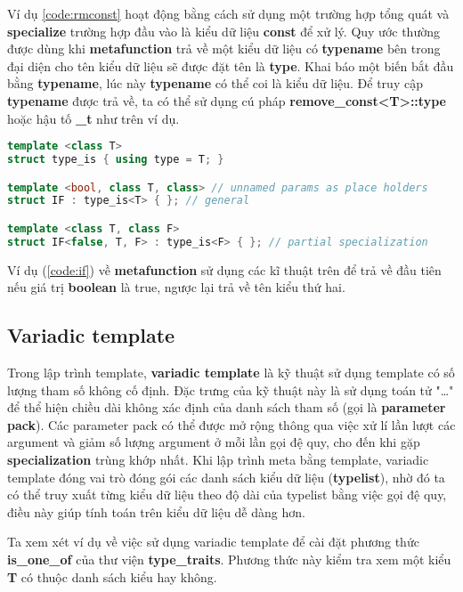 Ví dụ \ref{code:rmconst} hoạt động bằng cách sử dụng một trường hợp tổng quát và \textbf{specialize} trường hợp đầu vào là kiểu dữ liệu \textbf{const} để xử lý.
Quy ước thường được dùng khi \textbf{metafunction} trả về một kiểu dữ liệu có \textbf{typename} bên trong đại diện cho tên kiểu dữ liệu sẽ được đặt tên là \textbf{type}. Khai báo một biến bắt đầu bằng \textbf{typename}, lúc này \textbf{typename} có thể coi là kiểu dữ liệu. Để truy cập \textbf{typename} được trả về, ta có thể sử dụng cú pháp \textbf{remove\_const<T>::type} hoặc hậu tố \textbf{\_t} như trên ví dụ.

\begin{lstlisting}[caption={Trả về kiểu dữ liệu dựa trên điều kiện \cite{Walter}},label={code:if},language=C++]
template <class T>
struct type_is { using type = T; }

template <bool, class T, class> // unnamed params as place holders
struct IF : type_is<T> { }; // general

template <class T, class F>
struct IF<false, T, F> : type_is<F> { }; // partial specialization
\end{lstlisting}

\noindent Ví dụ (\ref{code:if}) về \textbf{metafunction} sử dụng các kĩ thuật trên để trả về đầu tiên nếu giá trị \textbf{boolean} là true, ngược lại trả về tên kiểu thứ hai.

\subsection{Variadic template}
Trong lập trình template, \textbf{variadic template} là kỹ thuật sử dụng template có số lượng tham số không cố định\cite{Variadic}. Đặc trưng của kỹ thuật này là sử dụng toán tử "\dots" để thể hiện chiều dài không xác định của danh sách tham số (gọi là \textbf{parameter pack}). Các parameter pack có thể được mở rộng thông qua việc xử lí lần lượt các argument và giảm số lượng argument ở mỗi lần gọi đệ quy, cho đến khi gặp \textbf{specialization} trùng khớp nhất. Khi lập trình meta bằng template, variadic template đóng vai trò đóng gói các danh sách kiểu dữ liệu (\textbf{typelist}), nhờ đó ta có thể truy xuất từng kiểu dữ liệu theo độ dài của typelist bằng việc gọi đệ quy, điều này giúp tính toán trên kiểu dữ liệu dễ dàng hơn.

Ta xem xét ví dụ về việc sử dụng variadic template để cài đặt phương thức \textbf{is\_one\_of} của thư viện \textbf{type\_traits}. Phương thức này kiểm tra xem một kiểu \textbf{T} có thuộc danh sách kiểu hay không.

